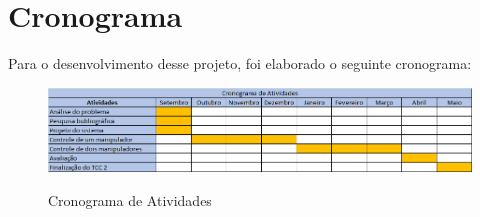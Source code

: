 \chapter[Cronograma]{Cronograma}
\label{cap:cronograma}

Para o desenvolvimento desse projeto, foi elaborado o seguinte cronograma:

\begin{figure}[htb!]
    \centering
    \caption{Cronograma de Atividades}
    \includegraphics[keepaspectratio=true,scale=0.62]
    	{img/Cronograma.png}
    \label{fig:cronogramaAtividades}
\end{figure}